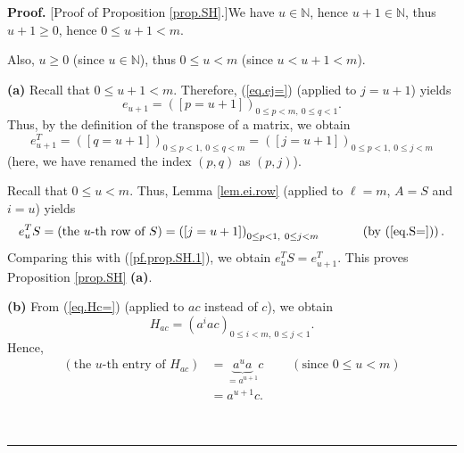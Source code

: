 \documentclass[numbers=enddot,12pt,final,onecolumn,notitlepage]{scrartcl}%
\theoremstyle{definition}
\newenvironment{proof}[1][Proof]{\noindent\textbf{#1.} }{\ \rule{0.5em}{0.5em}}
\newenvironment{verlong}{}{}
\begin{document}
\begin{verlong}
\begin{proof}
[Proof of Proposition \ref{prop.SH}.]We have $u\in\mathbb{N}$, hence
$u+1\in\mathbb{N}$, thus $u+1\geq0$, hence $0\leq u+1<m$.

Also, $u\geq0$ (since $u\in\mathbb{N}$), thus $0\leq u<m$ (since $u<u+1<m$).

\textbf{(a)} Recall that $0\leq u+1<m$. Therefore, (\ref{eq.ej=}) (applied to
$j=u+1$) yields%
\[
e_{u+1}=\left(  \left[  p=u+1\right]  \right)  _{0\leq p<m,\ 0\leq q<1}.
\]
Thus, by the definition of the transpose of a matrix, we obtain%
\begin{equation}
e_{u+1}^{T}=\left(  \left[  q=u+1\right]  \right)  _{0\leq p<1,\ 0\leq
q<m}=\left(  \left[  j=u+1\right]  \right)  _{0\leq p<1,\ 0\leq j<m}
\label{pf.prop.SH.1}%
\end{equation}
(here, we have renamed the index $\left(  p,q\right)  $ as $\left(
p,j\right)  $).

Recall that $0\leq u<m$. Thus, Lemma \ref{lem.ei.row} (applied to $\ell=m$,
$A=S$ and $i=u$) yields%
\[
e_{u}^{T}S=\left(  \text{the }u\text{-th row of }S\right)  =\left(  \left[
j=u+1\right]  \right)  _{0\leq p<1,\ 0\leq j<m}\ \ \ \ \ \ \ \ \ \ \left(
\text{by (\ref{eq.S=})}\right)  .
\]
Comparing this with (\ref{pf.prop.SH.1}), we obtain $e_{u}^{T}S=e_{u+1}^{T}$.
This proves Proposition \ref{prop.SH} \textbf{(a)}.

\textbf{(b)} From (\ref{eq.Hc=}) (applied to $ac$ instead of $c$), we obtain%
\[
H_{ac}=\left(  a^{i}ac\right)  _{0\leq i<m,\ 0\leq j<1}.
\]
Hence,%
\begin{align*}
\left(  \text{the }u\text{-th entry of }H_{ac}\right)   &  =\underbrace{a^{u}%
a}_{=a^{u+1}}c\ \ \ \ \ \ \ \ \ \ \left(  \text{since }0\leq u<m\right) \\
&  =a^{u+1}c.
\end{align*}



\end{proof}
\end{verlong}
\end{document}
